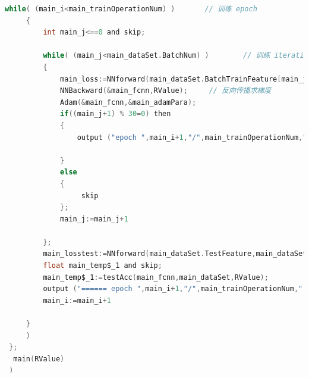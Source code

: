 \documentclass[UTF-8]{progbookcn}
\begin{document}
\begin{lstlisting}[language=C,caption={主函数代码}]
     while( (main_i<main_trainOperationNum) )       // 训练 epoch
     {
         int main_j<==0 and skip;

         while( (main_j<main_dataSet.BatchNum) )        // 训练 iteration
         {
             main_loss:=NNforward(main_dataSet.BatchTrainFeature[main_j],main_dataSet.BatchTrainLabelOneHot[main_j],&main_fcnn,RValue);     // 前向传播求损失
             NNBackward(&main_fcnn,RValue);     // 反向传播求梯度
             Adam(&main_fcnn,&main_adamPara);
             if((main_j+1) % 30=0) then
             {
                 output ("epoch ",main_i+1,"/",main_trainOperationNum," iteration ",main_j+1,"/",main_dataSet.BatchNum," loss=",F2S(main_loss,main_buf1,RValue),"\n") and skip

             }
             else
             {
                  skip
             };
             main_j:=main_j+1

         };
         main_losstest:=NNforward(main_dataSet.TestFeature,main_dataSet.TestLabelOneHot,&main_fcnn,RValue);
         float main_temp$_1 and skip;
         main_temp$_1:=testAcc(main_fcnn,main_dataSet,RValue);
         output ("====== epoch ",main_i+1,"/",main_trainOperationNum,"  testloss=",F2S(main_losstest,main_buf2,RValue),"  acc=",F2S(main_temp$_1,main_buf1,RValue)," ======\n") and skip;
         main_i:=main_i+1

     }
     )
 };
  main(RValue)
 )
\end{lstlisting}
\end{document}
